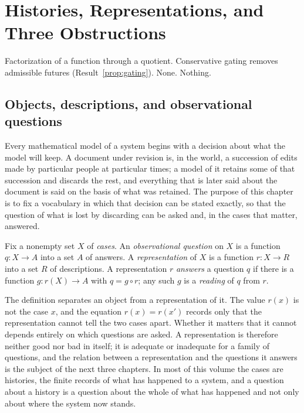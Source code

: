 \chapter{Histories, Representations, and Three Obstructions}\label{ch:common}
{Factorization of a function through a quotient.}
{Conservative gating removes admissible futures (Result~\ref{prop:gating}).}
{None.}
{Nothing.}

\section{Objects, descriptions, and observational questions}\label{sec:objects}

Every mathematical model of a system begins with a decision about what the model will keep. A document under revision is, in the world, a succession of edits made by particular people at particular times; a model of it retains some of that succession and discards the rest, and everything that is later said about the document is said on the basis of what was retained. The purpose of this chapter is to fix a vocabulary in which that decision can be stated exactly, so that the question of what is lost by discarding can be asked and, in the cases that matter, answered.

\begin{definition}\label{def:question}
Fix a nonempty set $X$ of \emph{cases}. An \emph{observational question} on $X$ is a function $q:X\to A$ into a set $A$ of answers. A \emph{representation} of $X$ is a function $r:X\to R$ into a set $R$ of descriptions. A representation $r$ \emph{answers} a question $q$ if there is a function $g:r(X)\to A$ with $q=g\circ r$; any such $g$ is a \emph{reading} of $q$ from $r$.
\end{definition}

The definition separates an object from a representation of it. The value $r(x)$ is not the case $x$, and the equation $r(x)=r(x')$ records only that the representation cannot tell the two cases apart. Whether it matters that it cannot depends entirely on which questions are asked. A representation is therefore neither good nor bad in itself; it is adequate or inadequate for a family of questions, and the relation between a representation and the questions it answers is the subject of the next three chapters. In most of this volume the cases are histories, the finite records of what has happened to a system, and a question about a history is a question about the whole of what has happened and not only about where the system now stands.

